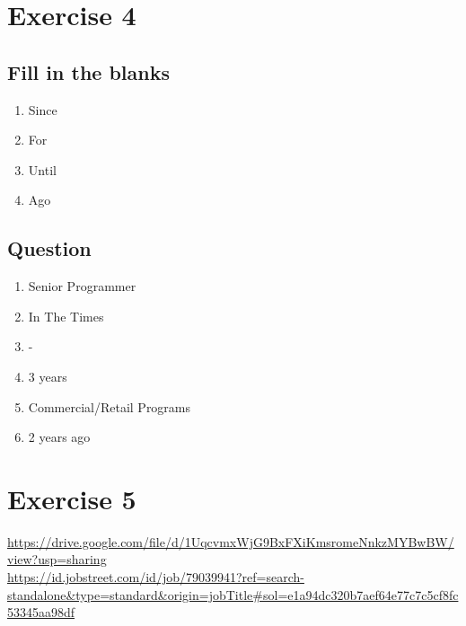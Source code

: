 \documentclass[12pt,titlepage]{article}
\begin{document}
\section*{Exercise 4}
\subsection*{Fill in the blanks}
\begin{enumerate}
    \item Since
    \item For
    \item Until
    \item Ago
\end{enumerate}
\subsection*{Question}
\begin{enumerate}
    \item Senior Programmer
    \item In The Times
    \item -
    \item 3 years
    \item Commercial/Retail Programs
    \item 2 years ago
\end{enumerate}
\section*{Exercise 5}
\noindent
\url{https://drive.google.com/file/d/1UqcvmxWjG9BxFXiKmsromeNnkzMYBwBW/view?usp=sharing} \\
\url{https://id.jobstreet.com/id/job/79039941?ref=search-standalone&type=standard&origin=jobTitle#sol=e1a94dc320b7aef64e77c7c5cf8fc53345aa98df}
\end{document}
